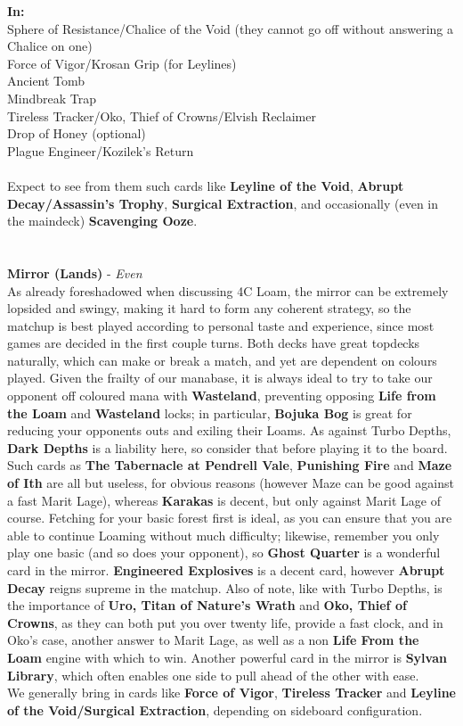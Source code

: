 \documentclass{report}
\begin{document}
\textbf{In:}\\
Sphere of Resistance/Chalice of the Void (they cannot go off without answering a Chalice on one)\\Force of Vigor/Krosan Grip (for Leylines)\\Ancient Tomb\\Mindbreak Trap\\Tireless Tracker/Oko, Thief of Crowns/Elvish Reclaimer\\Drop of Honey (optional)\\Plague Engineer/Kozilek's Return\\\\
Expect to see from them such cards like \textbf{Leyline of the Void}, \textbf{Abrupt Decay/Assassin's Trophy}, \textbf{Surgical Extraction}, and occasionally (even in the maindeck) \textbf{Scavenging Ooze}.\\\\\\
\textbf{Mirror (Lands)} - \emph{Even}\\
As already foreshadowed when discussing 4C Loam, the mirror can be extremely lopsided and swingy, making it hard to form any coherent strategy, so the matchup is best played according to personal taste and experience, since most games are decided in the first couple turns. Both decks have great topdecks naturally, which can make or break a match, and yet are dependent on colours played. Given the frailty of our manabase, it is always ideal to try to take our opponent off coloured mana with \textbf{Wasteland}, preventing opposing \textbf{Life from the Loam} and \textbf{Wasteland} locks; in particular, \textbf{Bojuka Bog} is great for reducing your opponents outs and exiling their Loams. As against Turbo Depths, \textbf{Dark Depths} is a liability here, so consider that before playing it to the board. Such cards as \textbf{The Tabernacle at Pendrell Vale}, \textbf{Punishing Fire} and \textbf{Maze of Ith} are all but useless, for obvious reasons (however Maze can be good against a fast Marit Lage), whereas \textbf{Karakas} is decent, but only against Marit Lage of course. Fetching for your basic forest first is ideal, as you can ensure that you are able to continue Loaming without much difficulty; likewise, remember you only play one basic (and so does your opponent), so \textbf{Ghost Quarter} is a wonderful card in the mirror. \textbf{Engineered Explosives} is a decent card, however \textbf{Abrupt Decay} reigns supreme in the matchup. Also of note, like with Turbo Depths, is the importance of \textbf{Uro, Titan of Nature's Wrath} and \textbf{Oko, Thief of Crowns}, as they can both put you over twenty life, provide a fast clock, and in Oko's case, another answer to Marit Lage, as well as a non \textbf{Life From the Loam} engine with which to win. Another powerful card in the mirror is \textbf{Sylvan Library}, which often enables one side to pull ahead of the other with ease.\\ We generally bring in cards like \textbf{Force of Vigor}, \textbf{Tireless Tracker} and \textbf{Leyline of the Void/Surgical Extraction}, depending on sideboard configuration.
\end{document}
